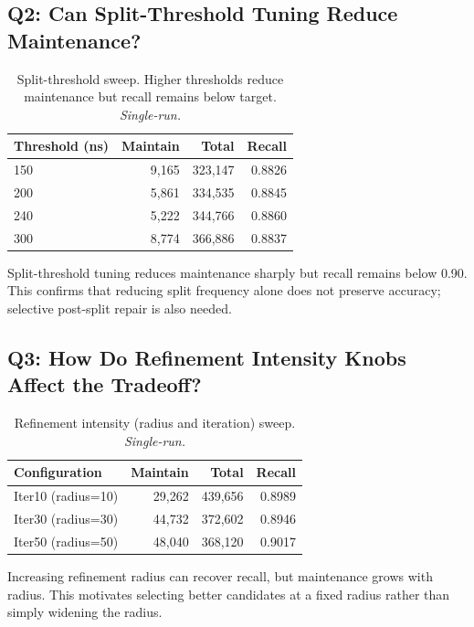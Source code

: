 \documentclass[sigconf, nonacm]{acmart}
\begin{document}
\subsection{Q2: Can Split-Threshold Tuning Reduce Maintenance?}
\label{sec:eval_q2}

\begin{table}[h]
\centering
\caption{Split-threshold sweep. Higher thresholds reduce maintenance
  but recall remains below target. \textit{Single-run.}}
\label{tab:split}
\begin{tabular}{lrrr}
  \toprule
  Threshold (ns) & Maintain & Total & Recall \\
  \midrule
  150 &  9,165 & 323,147 & 0.8826 \\
  200 &  5,861 & 334,535 & 0.8845 \\
  240 &  5,222 & 344,766 & 0.8860 \\
  300 &  8,774 & 366,886 & 0.8837 \\
  \bottomrule
\end{tabular}
\end{table}

Split-threshold tuning reduces maintenance sharply but recall remains
below 0.90. This confirms that reducing split frequency alone does not
preserve accuracy; selective post-split repair is also needed.

\subsection{Q3: How Do Refinement Intensity Knobs Affect the Tradeoff?}
\label{sec:eval_q3}

\begin{table}[h]
\centering
\caption{Refinement intensity (radius and iteration) sweep.
  \textit{Single-run.}}
\label{tab:iteration}
\begin{tabular}{lrrr}
  \toprule
  Configuration & Maintain & Total & Recall \\
  \midrule
  Iter10 (radius=10) &  29,262 & 439,656 & 0.8989 \\
  Iter30 (radius=30) &  44,732 & 372,602 & 0.8946 \\
  Iter50 (radius=50) &  48,040 & 368,120 & 0.9017 \\
  \bottomrule
\end{tabular}
\end{table}

Increasing refinement radius can recover recall, but maintenance grows
with radius. This motivates selecting better candidates at a fixed
radius rather than simply widening the radius.
\end{document}
